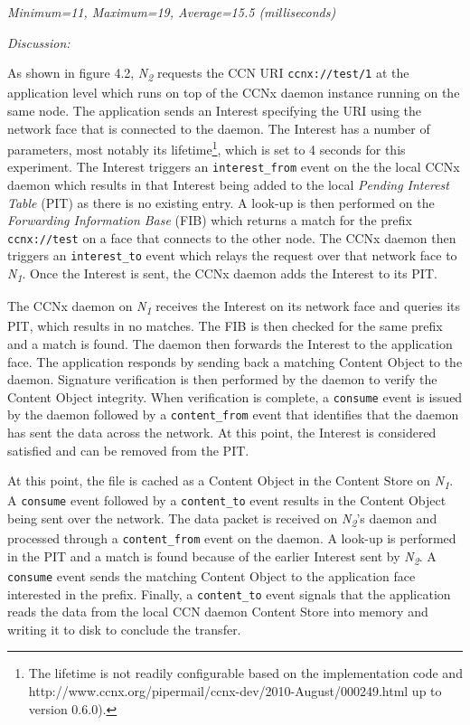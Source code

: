 \documentclass[a4paper,12pt]{report}      %
\begin{document}
\begin{center}\textsl{Minimum=11, Maximum=19, Average=15.5 (milliseconds)}\end{center}

\noindent\emph{Discussion:}

As shown in figure 4.2, \emph{N\textsubscript{2}} requests the CCN URI \verb!ccnx://test/1! at the application level which runs on top of the CCNx daemon instance running on the same node. The application sends an Interest 
specifying the URI using the network face that is connected to the daemon. The Interest has a
number of parameters, most notably its lifetime\footnote{The lifetime is not readily configurable based on the implementation code and http://www.ccnx.org/pipermail/ccnx-dev/2010-August/000249.html up to version 0.6.0).}, which is set to 4 seconds for this experiment\cite{CCNxIM}.
The Interest triggers an \verb!interest_from! event on the the local CCNx daemon which results in that
Interest being added to the local \textsl{Pending Interest Table} (PIT) as there is no existing entry. A look-up is then performed on the \textsl{Forwarding Information Base} (FIB) which returns a match for the prefix
\verb!ccnx://test! on a face that connects to the other node. The CCNx daemon then
triggers an \verb!interest_to! event which relays the request over that network face to \emph{N\textsubscript{1}}. Once
the Interest is sent, the CCNx daemon adds the Interest to its PIT.

The CCNx daemon on \emph{N\textsubscript{1}} receives the Interest on its network face and
queries its PIT, which results in no matches. The FIB is then checked for the same prefix and a match is found. The daemon then forwards the Interest to the application face. The application responds by sending back a matching Content Object to the daemon. Signature verification is then performed by the daemon to verify the Content Object integrity. When verification is complete, a \verb!consume! event is issued by the daemon followed by a \verb!content_from! event that identifies that the daemon has sent the data across the network. At this point, the Interest is considered satisfied and can be removed from the PIT.

At this point, the file is cached as a Content Object in the Content Store on  \emph{N\textsubscript{1}}. A
\verb!consume! event followed by a \verb!content_to! event results in the Content Object being sent over the network. The data packet is received on \emph{N\textsubscript{2}}'s daemon and processed through a \verb!content_from! event on the daemon. A look-up is performed in the PIT and a match is found because of the earlier Interest sent by \emph{N\textsubscript{2}}. A \verb!consume! event sends the matching Content Object to the application face interested in the prefix. Finally, a \verb!content_to! event signals that the application reads the data from the local CCN daemon Content Store into memory and writing it to disk to conclude the transfer.
\end{document}
